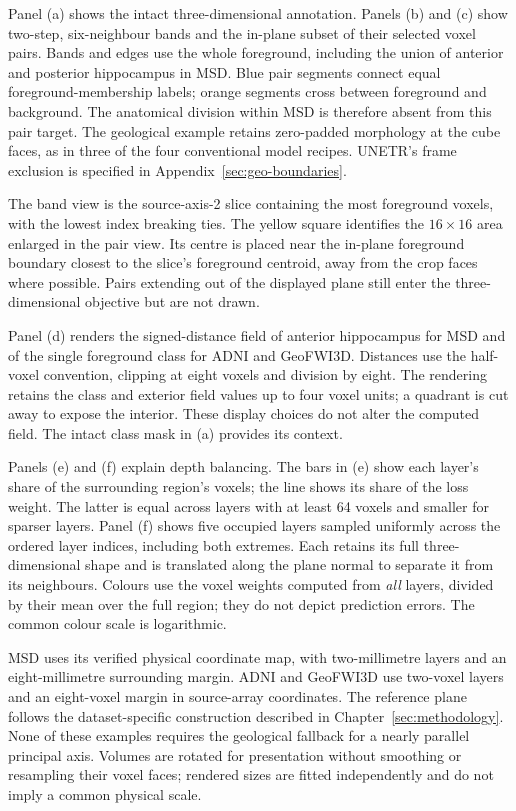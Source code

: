 \documentclass[12pt,a4paper]{article}
\begin{document}
Panel (a) shows the intact three-dimensional annotation. Panels (b) and (c)
show two-step, six-neighbour bands and the in-plane subset of their selected
voxel pairs. Bands and edges use the whole foreground, including the union
of anterior and posterior hippocampus in MSD. Blue pair segments connect
equal foreground-membership labels; orange segments cross between foreground
and background. The anatomical division within MSD is therefore absent from
this pair target. The geological example retains zero-padded morphology at
the cube faces, as in three of the four conventional model recipes. UNETR's
frame exclusion is specified in Appendix~\ref{sec:geo-boundaries}.

The band view is the source-axis-2 slice containing the most foreground
voxels, with the lowest index breaking ties. The yellow square identifies
the $16\times16$ area enlarged in the pair view. Its centre is placed near
the in-plane foreground boundary closest to the slice's foreground centroid,
away from the crop faces where possible. Pairs extending out of the displayed
plane still enter the three-dimensional objective but are not drawn.

Panel (d) renders the signed-distance field of anterior hippocampus for MSD
and of the single foreground class for ADNI and GeoFWI3D. Distances use the
half-voxel convention, clipping at eight voxels and division by eight. The
rendering retains the class and exterior field values up to four voxel units;
a quadrant is cut away to expose the interior. These display choices do not
alter the computed field. The intact class mask in (a) provides its context.

Panels (e) and (f) explain depth balancing. The bars in (e) show each layer's
share of the surrounding region's voxels; the line shows its share of the
loss weight. The latter is equal across layers with at least 64 voxels and
smaller for sparser layers. Panel (f) shows five occupied layers sampled
uniformly across the ordered layer indices, including both extremes. Each
retains its full three-dimensional shape and is translated along the plane
normal to separate it from its neighbours. Colours use the voxel weights
computed from \emph{all} layers, divided by their mean over the full region;
they do not depict prediction errors. The common colour scale is logarithmic.

MSD uses its verified physical coordinate map, with two-millimetre layers
and an eight-millimetre surrounding margin. ADNI and GeoFWI3D use two-voxel
layers and an eight-voxel margin in source-array coordinates. The reference
plane follows the dataset-specific construction described in
Chapter~\ref{sec:methodology}. None of these examples requires the geological
fallback for a nearly parallel principal axis. Volumes are rotated for
presentation without smoothing or resampling their voxel faces; rendered
sizes are fitted independently and do not imply a common physical scale.
\end{document}

